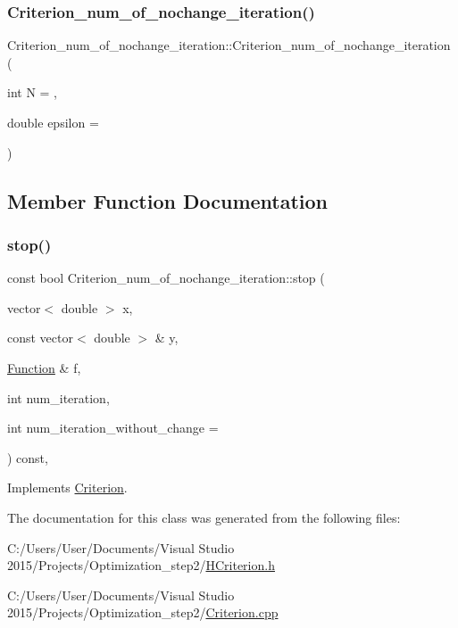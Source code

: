 \subsubsection{\texorpdfstring{Criterion\+\_\+num\+\_\+of\+\_\+nochange\+\_\+iteration()}{Criterion\_num\_of\_nochange\_iteration()}}
{\footnotesize\ttfamily Criterion\+\_\+num\+\_\+of\+\_\+nochange\+\_\+iteration\+::\+Criterion\+\_\+num\+\_\+of\+\_\+nochange\+\_\+iteration (\begin{DoxyParamCaption}\item[{int}]{N = {},  }\item[{double}]{epsilon = {} }\end{DoxyParamCaption})\hspace{0.3cm}{\ttfamily [inline]}}



\subsection{Member Function Documentation}
\mbox{\label{class_criterion__num__of__nochange__iteration_a7ced10cb8ce2f4979ae0d25287d91a40}} 
\subsubsection{\texorpdfstring{stop()}{stop()}}
{\footnotesize\ttfamily const bool Criterion\+\_\+num\+\_\+of\+\_\+nochange\+\_\+iteration\+::stop (\begin{DoxyParamCaption}\item[{vector$<$ double $>$}]{x,  }\item[{const vector$<$ double $>$ \&}]{y,  }\item[{\hyperlink{class_function}{Function} \&}]{f,  }\item[{int}]{num\+\_\+iteration,  }\item[{int}]{num\+\_\+iteration\+\_\+without\+\_\+change = {} }\end{DoxyParamCaption}) const\hspace{0.3cm}{\ttfamily [override]}, {\ttfamily [virtual]}}



Implements \hyperlink{class_criterion_aee3e2148c665c72c50c2f870a3ca8cdc}{Criterion}.



The documentation for this class was generated from the following files\+:\begin{DoxyCompactItemize}
\item 
C\+:/\+Users/\+User/\+Documents/\+Visual Studio 2015/\+Projects/\+Optimization\+\_\+step2/\hyperlink{_h_criterion_8h}{H\+Criterion.\+h}\item 
C\+:/\+Users/\+User/\+Documents/\+Visual Studio 2015/\+Projects/\+Optimization\+\_\+step2/\hyperlink{_criterion_8cpp}{Criterion.\+cpp}\end{DoxyCompactItemize}
